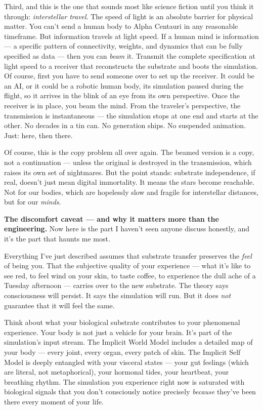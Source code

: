 \documentclass[11pt, twoside, openright]{book}
\begin{document}
Third, and this is the one that sounds most like science fiction until you think it through: \textit{interstellar travel}. The speed of light is an absolute barrier for physical matter. You can't send a human body to Alpha Centauri in any reasonable timeframe. But information travels at light speed. If a human mind is information --- a specific pattern of connectivity, weights, and dynamics that can be fully specified as data --- then you can \textit{beam} it. Transmit the complete specification at light speed to a receiver that reconstructs the substrate and boots the simulation. Of course, first you have to send someone over to set up the receiver. It could be an AI, or it could be a robotic human body, its simulation paused during the flight, so it arrives in the blink of an eye from its own perspective. Once the receiver is in place, you beam the mind. From the traveler's perspective, the transmission is instantaneous --- the simulation stops at one end and starts at the other. No decades in a tin can. No generation ships. No suspended animation. Just: here, then there.

Of course, this is the copy problem all over again. The beamed version is a copy, not a continuation --- unless the original is destroyed in the transmission, which raises its own set of nightmares. But the point stands: substrate independence, if real, doesn't just mean digital immortality. It means the stars become reachable. Not for our bodies, which are hopelessly slow and fragile for interstellar distances, but for our \textit{minds}.

\textbf{The discomfort caveat --- and why it matters more than the engineering.} Now here is the part I haven't seen anyone discuss honestly, and it's the part that haunts me most.

Everything I've just described assumes that substrate transfer preserves the \textit{feel} of being you. That the subjective quality of your experience --- what it's like to see red, to feel wind on your skin, to taste coffee, to experience the dull ache of a Tuesday afternoon --- carries over to the new substrate. The theory says consciousness will persist. It says the simulation will run. But it does \textit{not} guarantee that it will feel the same.

Think about what your biological substrate contributes to your phenomenal experience. Your body is not just a vehicle for your brain. It's part of the simulation's input stream. The Implicit World Model includes a detailed map of your body --- every joint, every organ, every patch of skin. The Implicit Self Model is deeply entangled with your visceral states --- your gut feelings (which are literal, not metaphorical), your hormonal tides, your heartbeat, your breathing rhythm. The simulation you experience right now is saturated with biological signals that you don't consciously notice precisely \textit{because} they've been there every moment of your life.
\end{document}
